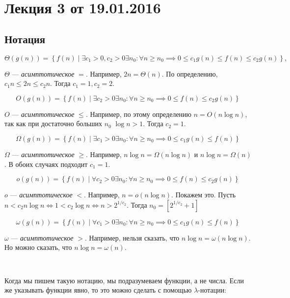 



\section*{Лекция 3 от 19.01.2016}

\subsection*{Нотация}

\[\Theta(g(n)) = \left\{ f(n)\mid \exists c_1>0, c_2>0 \exists n_0: \forall n \geqslant n_0 \implies 0\leqslant c_1g(n)\leqslant f(n) \leqslant c_2g(n) \right\},\]

$\Theta$ --- \emph{асимптотическое} $=$. Например, $2n = \Theta(n)$. По определению, $c_1n \leqslant 2n \leqslant c_2n$. Тогда $c_1 = 1, c_2 = 2$.

\[O(g(n)) = \left\{ f(n)\mid \exists  c_2>0 \exists n_0: \forall n \geqslant n_0 \implies 0\leqslant f(n) \leqslant c_2g(n) \right\}\]

$O$ --- \emph{асимптотическое} $\leqslant$. Например, по этому определению $n = O(n \log{n})$, так как при достаточно больших $n_0$ $\log n > 1$. Тогда $c_2 = 1$.

\[\Omega(g(n)) = \left\{ f(n)\mid \exists c_1>0 \exists n_0: \forall n \geqslant n_0 \implies 0\leqslant c_1g(n)\leqslant f(n) \right\}\]

$\Omega$ --- \emph{асимптотическое} $\geqslant$. Например, $n \log n = \Omega(n \log n)$ и $n \log n = \Omega(n)$. В обоих случаях подходит $c_1 = 1$.

\[o(g(n)) = \left\{ f(n)\mid \forall  c_2>0 \exists n_0: \forall n \geqslant n_0 \implies 0\leqslant f(n) \leqslant c_2g(n) \right\}\]

$o$ --- \emph{асимптотическое} $<$. Например, $n = o(n \log n)$. Покажем это. Пусть $n < c_2 n \log n \iff 1 < c_2 \log n \iff n > 2^{1/c_2}$. Тогда $n_0 = [2^{1/c_2} + 1]$

\[\omega(g(n)) = \left\{ f(n)\mid \forall c_1>0 \exists n_0: \forall n \geqslant n_0 \implies 0\leqslant c_1g(n)\leqslant f(n) \right\}\]

$\omega$ --- \emph{асимптотическое} $>$. Например, нельзя сказать, что $n \log n = \omega(n \log n)$. Но можно сказать, что  $n \log n = \omega(n)$. 

\

Когда мы пишем такую нотацию, мы подразумеваем функции, а не числа. Если же указывать функции явно, то это можно сделать с помощью $\lambda$-нотации:

